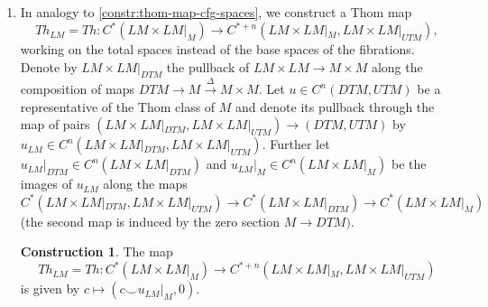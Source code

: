 \documentclass{scrartcl}
\theoremstyle{plain}
\theoremstyle{definition}
\newtheorem{construction}[theorem]{Construction}
\newcommand{\cupp}{\mathbin{\smile}}
\DeclareMathOperator{\cone}{cone}
\newcommand{\quiso}{\simeq}
\newcommand{\from}{\leftarrow}
\let\xto\xrightarrow
\begin{document}
\begin{enumerate}[(1)]
\item 
In analogy to \cref{constr:thom-map-cfg-spaces}, we construct a Thom map $$Th_{LM} = Th \colon C^*(LM\times LM|_M) \to C^{*+n}(LM\times LM|_M, LM\times LM|_{UTM}), $$ working on the total spaces instead of the base spaces of the fibrations. Denote by $LM\times LM|_{DTM}$ the pullback of $LM\times LM\to M\times M$ along the composition of maps $DTM\to M\xto{\Delta} M\times M$. Let $u\in C^{n}(DTM, UTM)$ be a representative of the Thom class of $M$ and denote its pullback through the map of pairs $(LM\times LM|_{DTM}, LM\times LM|_{UTM})\to (DTM, UTM)$ by $u_{LM}\in C^{n}(LM\times LM|_{DTM}, LM\times LM|_{UTM})$. Further let $u_{LM}|_{DTM}\in C^n(LM\times LM|_{DTM})$ and $u_{LM}|_M\in C^n(LM\times LM|_M)$ be the images of $u_{LM}$ along the maps $C^*(LM\times LM|_{DTM}, LM\times LM|_{UTM})\to C^*(LM\times LM|_{DTM})\to C^*(LM\times LM|_M)$ (the second map is induced by the zero section $M\to DTM)$. 
\begin{construction}
    The map $$Th_{LM} = Th \colon C^*(LM\times LM|_M) \to C^{*+n}(LM\times LM|_M, LM\times LM|_{UTM})$$ is given by $c\mapsto (c\cupp u_{LM}|_M, 0)$.
\end{construction}



\end{enumerate}
\end{document}
